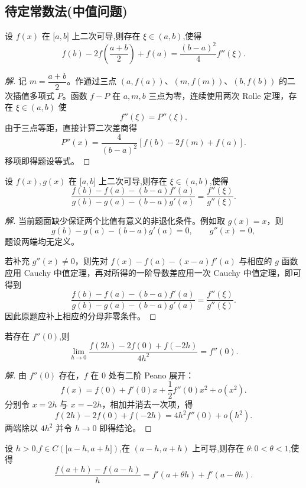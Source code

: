 \documentclass[../../数学分析培优讲义(答案版).tex]{subfiles}
\begin{document}
\subsection{待定常数法(中值问题)}

\begin{example}
设 $f(x)$ 在 $\lbrack a,b\rbrack$ 上二次可导,则存在 $\xi\in(a,b)$,使得
\[
    f(b)-2f\left(\dfrac{a+b}{2}\right)+f(a)
    =\dfrac{(b-a)^2}{4}f''(\xi).
\]
\end{example}

\begin{proof}[解]
记 $m=\dfrac{a+b}{2}$。作通过三点 $(a,f(a))$、$(m,f(m))$、$(b,f(b))$ 的二次插值多项式 $P$。函数 $f-P$ 在 $a,m,b$ 三点为零，连续使用两次 Rolle 定理，存在 $\xi\in(a,b)$ 使
\[
    f''(\xi)=P''(\xi).
\]
由于三点等距，直接计算二次差商得
\[
    P''(x)=\dfrac{4}{(b-a)^2}
    \left[f(b)-2f(m)+f(a)\right].
\]
移项即得题设等式。
\end{proof}

\begin{example}
设 $f(x),g(x)$ 在 $\lbrack a,b\rbrack$ 上二次可导,则存在 $\xi\in(a,b)$,使得
\[
    \dfrac{f(b)-f(a)-(b-a)f'(a)}{g(b)-g(a)-(b-a)g'(a)}
    =\dfrac{f''(\xi)}{g''(\xi)}.
\]
\end{example}

\begin{proof}[解]
当前题面缺少保证两个比值有意义的非退化条件。例如取 $g(x)=x$，则
\[
    g(b)-g(a)-(b-a)g'(a)=0,
    \qquad
    g''(x)=0,
\]
题设两端均无定义。

若补充 $g''(x)\neq0$，则先对 $f(x)-f(a)-(x-a)f'(a)$ 与相应的 $g$ 函数应用 Cauchy 中值定理，再对所得的一阶导数差应用一次 Cauchy 中值定理，即可得到
\[
    \dfrac{f(b)-f(a)-(b-a)f'(a)}
    {g(b)-g(a)-(b-a)g'(a)}
    =\dfrac{f''(\xi)}{g''(\xi)}.
\]
因此原题应补上相应的分母非零条件。
\end{proof}

\begin{example}
若存在 $f''(0)$,则
\[
    \lim\limits_{h\to0}
    \dfrac{f(2h)-2f(0)+f(-2h)}{4h^2}
    =f''(0).
\]
\end{example}

\begin{proof}[解]
由 $f''(0)$ 存在，$f$ 在 $0$ 处有二阶 Peano 展开：
\[
    f(x)=f(0)+f'(0)x+\dfrac{1}{2}f''(0)x^2+o(x^2).
\]
分别令 $x=2h$ 与 $x=-2h$，相加并消去一次项，得
\[
    f(2h)-2f(0)+f(-2h)=4h^2f''(0)+o(h^2).
\]
两端除以 $4h^2$ 并令 $h\to0$ 即得结论。
\end{proof}

\begin{example}
设 $h>0$,$f\in C(\lbrack a-h,a+h\rbrack)$,在 $(a-h,a+h)$ 上可导,则存在 $\theta:0<\theta<1$,使得
\[
    \dfrac{f(a+h)-f(a-h)}{h}
    =f'(a+\theta h)+f'(a-\theta h).
\]
\end{example}
\end{document}
